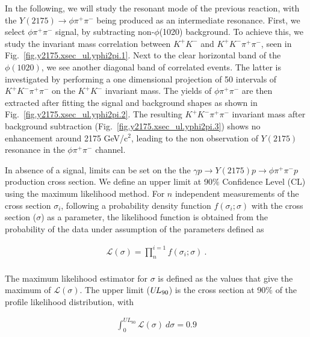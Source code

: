 In the following, we will study the resonant mode of the previous reaction, with the $Y(2175) \rightarrow \phi \pi^{+} \pi^{-}$ being produced as an intermediate resonance. First, we select $\phi \pi^+ \pi^-$ signal, by subtracting non-$\phi$(1020) background. To achieve this, we study the invariant mass correlation between $K^{+}K^{-}$ and $K^{+}K^{-} \pi^+ \pi^-$, seen in Fig.~\ref{fig.y2175.xsec_ul.yphi2pi.1}. Next to the clear horizontal band of the $\phi(1020)$, we see another diagonal band of correlated events. The latter is investigated by performing a one dimensional projection of 50 intervals of $K^{+}K^{-} \pi^+ \pi^-$ on the $K^{+}K^{-}$ invariant mass. The yields of $\phi \pi^+ \pi^-$ are then extracted after fitting the signal and background shapes as shown in Fig.~\ref{fig.y2175.xsec_ul.yphi2pi.2}. The resulting $K^{+}K^{-} \pi^+ \pi^-$ invariant mass after background subtraction (Fig.~\ref{fig.y2175.xsec_ul.yphi2pi.3}) shows no enhancement around 2175 GeV/c$^2$, leading to the non observation of $Y(2175)$ resonance in the $\phi \pi^+ \pi^-$ channel. 
~\par In absence of a signal, limits can be set on the the $\gamma p \rightarrow Y(2175) p \rightarrow \phi \pi^{+} \pi^{-} p$ production cross section. We define an upper limit at 90$\%$ Confidence Level (CL) using the maximum likelihood method. For $n$ independent measurements of the cross section $\sigma_{i}$, following a probability density function $f(\sigma_{i};\sigma)$ with the cross section ($\sigma$) as a parameter, the likelihood function is obtained from the probability of the data under assumption of the parameters defined as

\begin{equation}
    \label{eq.y2175.xsec_ul.yphi2pi.1}
    \begin{aligned}
        \mathcal{L(\sigma)} = \prod_{n}^{i=1} f(\sigma_{i};\sigma)~.\\
    \end{aligned}
\end{equation}

\noindent The maximum likelihood estimator for $\sigma$ is defined as the values that give the maximum of $\mathcal{L(\sigma)}$. The upper limit ($U\kern-0.14em L_{90}$) is the cross section at 90$\%$ of the profile likelihood distribution, with

\begin{equation}
    \label{eq.y2175.xsec_ul.yphi2pi.2}
    \begin{aligned}
        \int_{0}^{UL_{90}} \mathcal{L}(\sigma)~d\sigma = 0.9 \\
    \end{aligned}
\end{equation}

